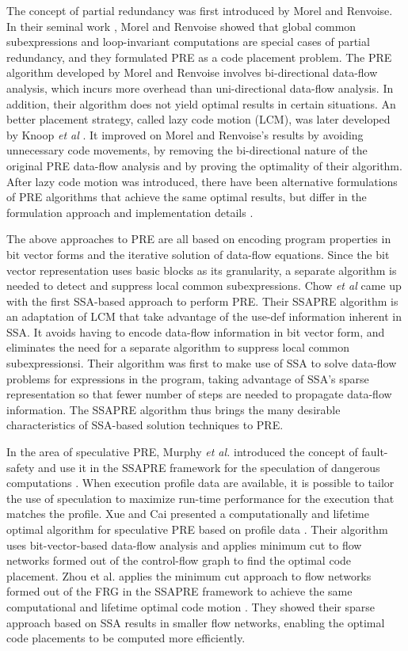 The concept of partial redundancy was first introduced by Morel and 
Renvoise.  In their seminal work \cite{MR79}, Morel and Renvoise showed that
global common subexpressions and loop-invariant computations are special
cases of partial redundancy, and they formulated PRE as a code placement
problem.  The PRE algorithm developed by Morel and Renvoise
involves bi-directional data-flow analysis, which incurs more overhead
than uni-directional data-flow analysis.  In addition, their algorithm
does not yield optimal results in certain situations.
An better placement strategy, called lazy code motion (LCM), was later 
developed by Knoop {\it et al} \cite{Knoop92}\cite{Knoop94}.  It improved on
Morel and Renvoise's results by avoiding unnecessary code movements, by
removing the bi-directional nature of the original PRE data-flow analysis and
by proving the optimality of their algorithm.
After lazy code motion was introduced, there have been alternative 
formulations of PRE algorithms that achieve the same optimal results, 
but differ in the formulation approach and implementation 
details \cite{DS93}\cite{Dhamdhere02}\cite{Paleri03}\cite{XueKnoop06}.

The above approaches to PRE are all based on encoding program properties 
in bit vector forms and the iterative solution of data-flow equations.
Since the bit vector representation uses basic blocks as its granularity,
a separate algorithm is needed to detect and suppress local common
subexpressions.
Chow {\it et al} \cite{Chow97}\cite{Kennedy99} came up with the first
SSA-based approach to perform PRE.  Their SSAPRE algorithm is an adaptation of 
LCM that take advantage of the use-def information inherent in SSA.  It avoids
having to encode data-flow information in bit vector form, and eliminates the
need for a separate algorithm to suppress local common subexpressionsi.
Their algorithm was first to make use of SSA to solve data-flow problems
for expressions in the program, taking advantage of SSA's sparse representation
so that fewer number of steps are needed to propagate data-flow information.  
The SSAPRE algorithm thus brings the many
desirable characteristics of SSA-based solution techniques to PRE.

In the area of speculative PRE,
Murphy {\it et al.} introduced the concept of fault-safety and use it in
the SSAPRE framework for the speculation of dangerous 
computations \cite{Murphy08}.   
When execution profile data are available, it is possible to tailor the use
of speculation to maximize run-time performance for the execution 
that matches the profile.  Xue and Cai presented a computationally 
and lifetime optimal algorithm
for speculative PRE based on profile data \cite{Xue06}.  Their algorithm
uses bit-vector-based data-flow analysis and applies minimum cut to flow
networks formed out of the control-flow graph to find the optimal code
placement.  Zhou {et al.} applies the 
minimum cut approach to flow networks formed out of the FRG in the SSAPRE 
framework to achieve the same computational and lifetime optimal code 
motion \cite{zhou11}.  They showed their sparse approach based on SSA results
in smaller flow networks, enabling the optimal code placements to be 
computed more efficiently.

